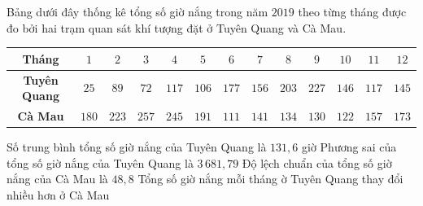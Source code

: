 \begin{ex}%
	Bảng dưới đây thống kê tổng số giờ nắng trong năm $2019$ theo từng tháng được đo bởi hai trạm quan sát khí tượng đặt ở Tuyên Quang và Cà Mau.
	\begin{center} 
		\begin{tabular}{|c|c|c|c|c|c|c|c|c|c|c|c|c|} 
			\hline 
			\textbf{Tháng} & $ 1$ & $2$ & $3$ & $4$ & $5$ & $6$ & $7$ & $8$ & $9$ & $10$ & $11$ & $12$\\ 
			\hline 
			\textbf{Tuyên Quang} & $25$ & $89$ & $72$ & $117$ & $106$ & $177$ & $156$ & $203$ & $227$ & $146$ & $117$ & $145$\\ 
			\hline 
			\textbf{Cà Mau} & $180$ & $223$ & $257$ & $245$ & $191$ & $111$ & $141$ & $134$ & $130$ & $122$ & $157$ & $173$\\ 
			\hline 
		\end{tabular}
	\end{center}
	\choiceTF
	{\True Số trung bình tổng số giờ nắng của Tuyên Quang là $131{,}6$ giờ }
	{Phương sai của tổng số giờ nắng của Tuyên Quang là $3\,681,79$}
	{\True Độ lệch chuẩn của tổng số giờ nắng của Cà Mau là $48{,}8$}
	{\True Tổng số giờ nắng mỗi tháng ờ Tuyên Quang thay đổi nhiều hơn ở Cà Mau}
\end{ex}

